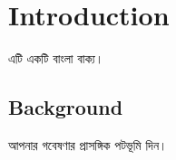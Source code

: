\chapter{Introduction}
এটি একটি বাংলা বাক্য। %

\section{Background}
আপনার গবেষণার প্রাসঙ্গিক পটভূমি দিন।
